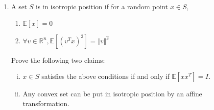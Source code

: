 \documentclass[11pt,a4paper]{article}
\begin{document}
\begin{enumerate}
\item A set $S$ is in isotropic position if for a random point $x ∈ S$, \begin{enumerate}
    \item $\mathbb{E}[x] = 0 $
    \item $\forall v \in \mathbb{R}^n, \mathbb{E}[(v^Tx)^2] = \Vert v \Vert^2$
\end{enumerate}
Prove the following two claims:
\begin{enumerate}[(i)]
    \item $x \in S$ satisfies the above conditions if and only if $\mathbb{E}[xx^T ] = I$.
    \item Any convex set can be put in isotropic position by an affine transformation.
\end{enumerate}



\end{enumerate}


%
%


 
\end{document}

